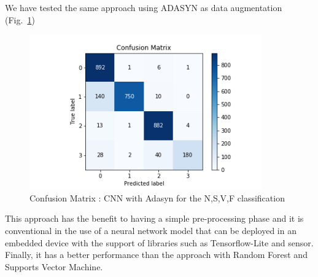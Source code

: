 \documentclass[LaM,binding=0.6cm]{sapthesis}
\begin{document}
We have tested the same approach using ADASYN as data augmentation (Fig.~\ref{fig:cnn2})
\begin{figure}[H]  \centering
    \includegraphics[width=100mm,scale=0.7]{cnn-adasyn.png}
    \caption{Confusion Matrix : CNN with Adasyn for the N,S,V,F classification}
    \label{fig:cnn2}
\end{figure}
This approach has the benefit to having a simple pre-processing phase and it is conventional in the use of a neural network model that can be deployed in an embedded device with the support of libraries such as Tensorflow-Lite and sensor.\\Finally, it has a better performance than the approach with Random Forest and Supports Vector Machine.
\end{document}
